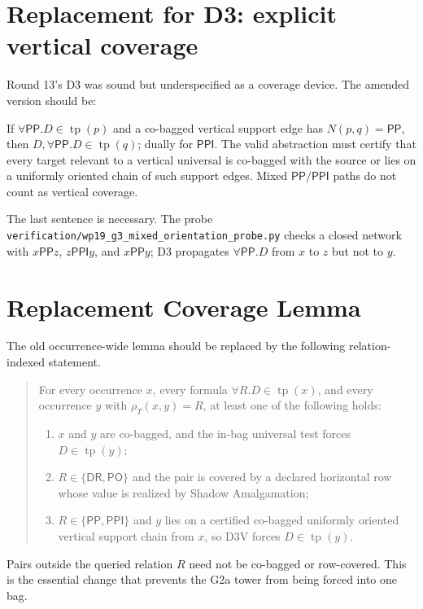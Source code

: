 \documentclass[11pt]{article}
\newcommand{\PP}{\mathsf{PP}}
\newcommand{\PPI}{\mathsf{PPI}}
\newcommand{\PO}{\mathsf{PO}}
\newcommand{\DR}{\mathsf{DR}}
\newcommand{\tp}{\operatorname{tp}}
\newcommand{\code}[1]{\texttt{#1}}
\begin{document}
\section{Replacement for D3: explicit vertical coverage}

Round 13's D3 was sound but underspecified as a coverage device.  The amended
version should be:
\begin{description}[leftmargin=2em]
\item[(D3V) Uniform vertical propagation.]
If $\forall\PP.D\in\tp(p)$ and a co-bagged vertical support edge has
$N(p,q)=\PP$, then $D,\forall\PP.D\in\tp(q)$; dually for $\PPI$.  The valid
abstraction must certify that every target relevant to a vertical universal is
co-bagged with the source or lies on a uniformly oriented chain of such support
edges.  Mixed $\PP/\PPI$ paths do not count as vertical coverage.
\end{description}

The last sentence is necessary.  The probe
\code{verification/wp19\_g3\_mixed\_orientation\_probe.py} checks a closed
network with $x\PP z$, $z\PPI y$, and $x\PP y$; D3 propagates
$\forall\PP.D$ from $x$ to $z$ but not to $y$.

\section{Replacement Coverage Lemma}

The old occurrence-wide lemma should be replaced by the following
relation-indexed statement.

\begin{quote}
For every occurrence $x$, every formula $\forall R.D\in\tp(x)$, and every
occurrence $y$ with $\rho_T(x,y)=R$, at least one of the following holds:
\begin{enumerate}[label=(\alph*),leftmargin=2em]
\item $x$ and $y$ are co-bagged, and the in-bag universal test forces
$D\in\tp(y)$;
\item $R\in\{\DR,\PO\}$ and the pair is covered by a declared horizontal row
whose value is realized by Shadow Amalgamation;
\item $R\in\{\PP,\PPI\}$ and $y$ lies on a certified co-bagged uniformly
oriented vertical support chain from $x$, so D3V forces $D\in\tp(y)$.
\end{enumerate}
\end{quote}

Pairs outside the queried relation $R$ need not be co-bagged or row-covered.
This is the essential change that prevents the G2a tower from being forced into
one bag.
\end{document}
